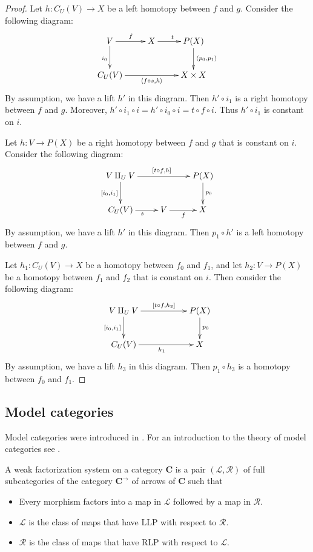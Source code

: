 \documentclass{amsart}
\theoremstyle{definition}
\newcommand{\cat}[1]{\mathbf{#1}}
\newcommand{\C}{\cat{C}}
\newcommand{\cyli}{i}
\begin{document}
\begin{proof}
Let $h : C_U(V) \to X$ be a left homotopy between $f$ and $g$.
Consider the following diagram:
\[ \xymatrix{ V \ar[r]^f \ar[d]_{\cyli_0} & X \ar[r]^t & P(X) \ar[d]^{\langle p_0, p_1 \rangle} \\
              C_U(V) \ar[rr]_{\langle f \circ s, h \rangle} & & X \times X
            } \]
By assumption, we have a lift $h'$ in this diagram.
Then $h' \circ \cyli_1$ is a right homotopy between $f$ and $g$.
Moreover, $h' \circ \cyli_1 \circ i = h' \circ \cyli_0 \circ i = t \circ f \circ i$.
Thus $h' \circ \cyli_1$ is constant on $i$.

Let $h : V \to P(X)$ be a right homotopy between $f$ and $g$ that is constant on $i$.
Consider the following diagram:
\[ \xymatrix{ V \amalg_U V \ar[rr]^{[t \circ f, h]} \ar[d]_{[\cyli_0,\cyli_1]} & & P(X) \ar[d]^{p_0} \\
              C_U(V) \ar[r]_s & V \ar[r]_f & X
            } \]
By assumption, we have a lift $h'$ in this diagram.
Then $p_1 \circ h'$ is a left homotopy between $f$ and $g$.

Let $h_1 : C_U(V) \to X$ be a homotopy between $f_0$ and $f_1$, and let $h_2 : V \to P(X)$ be a homotopy between $f_1$ and $f_2$ that is constant on $i$.
Then consider the following diagram:
\[ \xymatrix{ V \amalg_U V \ar[rr]^-{[t \circ f, h_2]} \ar[d]_{[\cyli_0,\cyli_1]} & & P(X) \ar[d]^{p_0} \\
              C_U(V) \ar[rr]_{h_1} & & X
            } \]
By assumption, we have a lift $h_3$ in this diagram.
Then $p_1 \circ h_3$ is a homotopy between $f_0$ and $f_1$.
\end{proof}

\subsection{Model categories}

Model categories were introduced in \cite{quillen}.
For an introduction to the theory of model categories see \cite{hirschhorn,hovey}.

\begin{defn} A weak factorization system on a category $\C$ is a pair $(\mathcal{L},\mathcal{R})$
of full subcategories of the category $\C^\to$ of arrows of $\C$ such that
\begin{itemize}
\item Every morphism factors into a map in $\mathcal{L}$ followed by a map in $\mathcal{R}$.
\item $\mathcal{L}$ is the class of maps that have LLP with respect to $\mathcal{R}$.
\item $\mathcal{R}$ is the class of maps that have RLP with respect to $\mathcal{L}$.
\end{itemize}
\end{defn}
\end{document}
